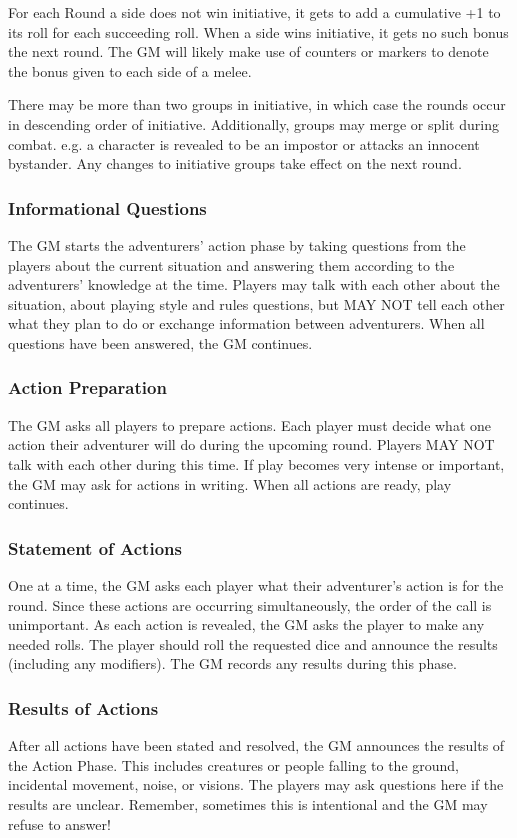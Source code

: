 For each Round a side does not win initiative, it gets to add a cumulative +1 to its roll for each succeeding roll. When a side wins initiative, it gets no such bonus the next round. The GM will likely make use of counters or markers to denote the bonus given to each side of a melee.

There may be more than two groups in initiative, in which case the rounds occur in descending order of initiative. Additionally, groups may merge or split during combat. e.g. a character is revealed to be an impostor or attacks an innocent bystander. Any changes to initiative groups take effect on the next round. 
\subsubsection{Informational Questions}
The GM starts the adventurers' action phase by taking questions from the players about the current situation and answering them according to the adventurers' knowledge at the time. Players may talk with each other about the situation, about playing style and rules questions, but MAY NOT tell each other what they plan to do or exchange information between adventurers. When all questions have been answered, the GM continues.
\subsubsection{Action Preparation}
The GM asks all players to prepare actions. Each player must decide what one action their adventurer will do during the upcoming round. Players MAY NOT talk with each other during this time. If play becomes very intense or important, the GM may ask for actions in writing. When all actions are ready, play continues.
\subsubsection{Statement of Actions}
One at a time, the GM asks each player what their adventurer's action is for the round. Since these actions are occurring simultaneously, the order of the call is unimportant. As each action is revealed, the GM asks the player to make any needed rolls. The player should roll the requested dice and announce the results (including any modifiers). The GM records any results during this phase.
\subsubsection{Results of Actions}
After all actions have been stated and resolved, the GM announces the results of the Action Phase. This includes creatures or people falling to the ground, incidental movement, noise, or visions. The players may ask questions here if the results are unclear. Remember, sometimes this is intentional and the GM may refuse to answer!
